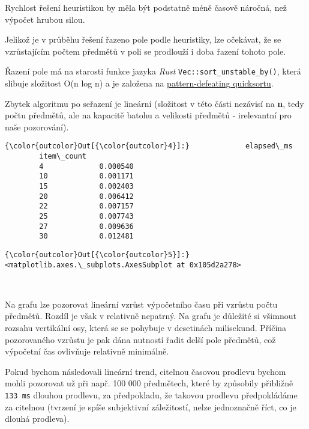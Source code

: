 \documentclass[11pt]{article}
\begin{document}
Rychlost řešení heuristikou by měla být podstatně méně časově náročná,
než výpočet hrubou silou.

Jelikož je v průběhu řešení řazeno pole podle heuristiky, lze očekávat,
že se vzrůstajícím počtem předmětů v poli se prodlouží i doba řazení
tohoto pole.

Řazení pole má na starosti funkce jazyka \emph{Rust}
\texttt{Vec::sort\_unstable\_by()}, která slibuje složitost O(n log n) a
je založena na \href{https://github.com/orlp/pdqsort}{pattern-defeating
quicksortu}.

Zbytek algoritmu po seřazení je lineární (složitost v této části
nezávisí na \textbf{n}, tedy počtu předmětů, ale na kapacitě batohu a
velikosti předmětů - irelevantní pro naše pozorování).


\begin{Verbatim}[commandchars=\\\{\}]
{\color{outcolor}Out[{\color{outcolor}4}]:}             elapsed\_ms
        item\_count            
        4             0.000540
        10            0.001171
        15            0.002403
        20            0.006412
        22            0.007157
        25            0.007743
        27            0.009636
        30            0.012481
\end{Verbatim}
            
\begin{Verbatim}[commandchars=\\\{\}]
{\color{outcolor}Out[{\color{outcolor}5}]:} <matplotlib.axes.\_subplots.AxesSubplot at 0x105d2a278>
\end{Verbatim}
            
    \begin{center}
    \end{center}
    { \hspace*{\fill} \\}
    
    Na grafu lze pozorovat lineární vzrůst výpočetního času při vzrůstu
počtu předmětů. Rozdíl je však v relativně nepatrný. Na grafu je
důležité si všimnout rozsahu vertikální osy, která se se pohybuje v
desetinách milisekund. Příčina pozorovaného vzrůstu je pak dána nutností
řadit delší pole předmětů, což výpočetní čas ovlivňuje relativně
minimálně.

Pokud bychom následovali lineární trend, citelnou časovou prodlevu
bychom mohli pozorovat už při např. 100 000 předmětech, které by
způsobily přibližně \texttt{133\ ms} dlouhou prodlevu, za předpokladu,
že takovou prodlevu předpokládáme za citelnou (tvrzení je spíše
subjektivní záležitostí, nelze jednoznačně říct, co je dlouhá prodleva).
\end{document}

